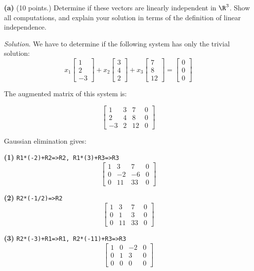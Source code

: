 \documentclass[12pt]{article}
\begin{document}
\textbf{(a)} (10 points.) Determine if these vectors are linearly independent in $\R^3$. Show all computations, and explain your solution in terms of the definition of linear independence.

\emph{Solution}. We have to determine if the following system has only the trivial solution:
\[
x_1\left[\begin{matrix}  1 \\ 2\\ -3\end{matrix}\right]+
x_2\left[\begin{matrix}  3 \\ 4\\  2\end{matrix}\right]+
x_3\left[\begin{matrix} 7 \\ 8\\ 12\end{matrix}\right]=
\left[\begin{matrix}0\\0\\0\end{matrix}\right]
\]

The augmented matrix of this system is:

\[\left[\begin{matrix}1 & 3 & 7 & 0\\2 & 4 & 8 & 0\\-3 & 2 & 12 & 0\end{matrix}\right]\]

Gaussian elimination gives:

\textbf{(1)} \texttt{R1*(-2)+R2=>R2, R1*(3)+R3=>R3}
\[\left[\begin{matrix}1 & 3 & 7 & 0\\0 & -2 & -6 & 0\\0 & 11 & 33 & 0\end{matrix}\right]\]

\textbf{(2)} \texttt{R2*(-1/2)=>R2}
\[\left[\begin{matrix}1 & 3 & 7 & 0\\0 & 1 & 3 & 0\\0 & 11 & 33 & 0\end{matrix}\right]\]

\textbf{(3)} \texttt{R2*(-3)+R1=>R1, R2*(-11)+R3=>R3}
\[\left[\begin{matrix}1 & 0 & -2 & 0\\0 & 1 & 3 & 0\\0 & 0 & 0 & 0\end{matrix}\right]\]
\end{document}
